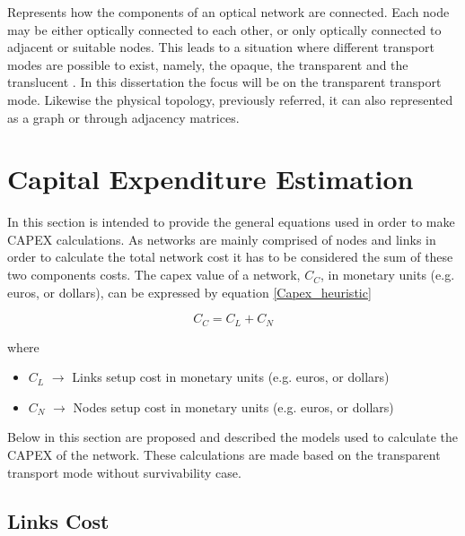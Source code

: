 Represents how the components of an optical network are connected. Each node may be either optically connected to each other, or only optically connected to adjacent or suitable nodes. This leads to a situation where different transport modes are possible to exist, namely, the opaque, the transparent and the translucent \cite{Vasco}. In this dissertation the focus will be on the transparent transport mode. Likewise the physical topology, previously referred, it can also represented as a graph or through adjacency matrices. %


\section{Capital Expenditure Estimation}
\label{CapitalExpanditure}

In this section is intended to provide the general equations used in order to make CAPEX calculations. As networks are mainly comprised of nodes and links in order to calculate the total network cost it has to be considered the sum of these two components costs. The \gls{capex} value of a network, $C_C$, in monetary units (e.g. euros, or dollars), can be expressed by equation \ref{Capex_heuristic}

\begin{equation}
C_C = C_L + C_N
\label{Capex_heuristic}
\end{equation}

\noindent
where

\begin{itemize}
\item{$C_L$				$\rightarrow$	Links setup cost in monetary units (e.g. euros, or dollars)}
\item{$C_N$				$\rightarrow$	Nodes setup cost in monetary units (e.g. euros, or dollars)}
\end{itemize}

Below in this section are proposed and described the models used to calculate the CAPEX of the network. These calculations are made based on the transparent transport mode without survivability case.

\subsection{Links Cost}
\label{linksCost_}

